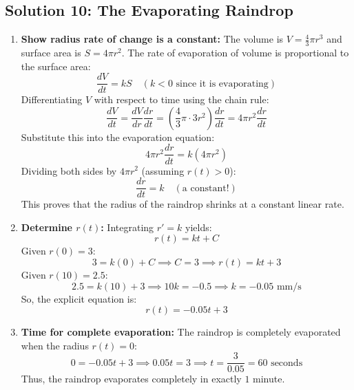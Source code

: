 \documentclass[11pt,letterpaper]{article}
\begin{document}
\subsection*{Solution 10: The Evaporating Raindrop}
\begin{enumerate}[label=(\alph*)]
    \item \textbf{Show radius rate of change is a constant:}
    The volume is $V = \frac{4}{3}\pi r^3$ and surface area is $S = 4\pi r^2$.
    The rate of evaporation of volume is proportional to the surface area:
    \[ \frac{dV}{dt} = k S \quad (k < 0 \text{ since it is evaporating}) \]
    Differentiating $V$ with respect to time using the chain rule:
    \[ \frac{dV}{dt} = \frac{dV}{dr} \frac{dr}{dt} = \left(\frac{4}{3}\pi \cdot 3r^2\right) \frac{dr}{dt} = 4\pi r^2 \frac{dr}{dt} \]
    Substitute this into the evaporation equation:
    \[ 4\pi r^2 \frac{dr}{dt} = k \left(4\pi r^2\right) \]
    Dividing both sides by $4\pi r^2$ (assuming $r(t) > 0$):
    \[ \frac{dr}{dt} = k \quad (\text{a constant!}) \]
    This proves that the radius of the raindrop shrinks at a constant linear rate.

    \item \textbf{Determine $r(t)$:}
    Integrating $r' = k$ yields:
    \[ r(t) = kt + C \]
    Given $r(0) = 3$:
    \[ 3 = k(0) + C \implies C = 3 \implies r(t) = kt + 3 \]
    Given $r(10) = 2.5$:
    \[ 2.5 = k(10) + 3 \implies 10k = -0.5 \implies k = -0.05 \text{ mm/s} \]
    So, the explicit equation is:
    \[ r(t) = -0.05t + 3 \]

    \item \textbf{Time for complete evaporation:}
    The raindrop is completely evaporated when the radius $r(t) = 0$:
    \[ 0 = -0.05t + 3 \implies 0.05t = 3 \implies t = \frac{3}{0.05} = 60 \text{ seconds} \]
    Thus, the raindrop evaporates completely in exactly $1$ minute.
\end{enumerate}
\end{document}
